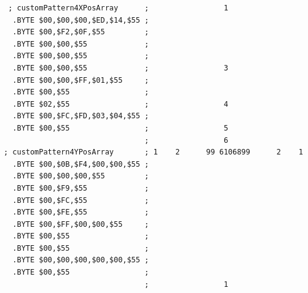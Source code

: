 \begin{lstlisting}
 ; customPattern4XPosArray      ;                 1                     
  .BYTE $00,$00,$00,$ED,$14,$55 ;                                       
  .BYTE $00,$F2,$0F,$55         ;                                       
  .BYTE $00,$00,$55             ;                                       
  .BYTE $00,$00,$55             ;                                       
  .BYTE $00,$00,$55             ;                 3                     
  .BYTE $00,$00,$FF,$01,$55     ;                                       
  .BYTE $00,$55                 ;                                       
  .BYTE $02,$55                 ;                 4                     
  .BYTE $00,$FC,$FD,$03,$04,$55 ;                                       
  .BYTE $00,$55                 ;                 5                     
                                ;                 6                     
; customPattern4YPosArray       ; 1    2      99 6106899      2    1    
  .BYTE $00,$0B,$F4,$00,$00,$55 ;                                       
  .BYTE $00,$00,$00,$55         ;                                       
  .BYTE $00,$F9,$55             ;                                       
  .BYTE $00,$FC,$55             ;                                       
  .BYTE $00,$FE,$55             ;                                       
  .BYTE $00,$FF,$00,$00,$55     ;                                       
  .BYTE $00,$55                 ;                                       
  .BYTE $00,$55                 ;                                       
  .BYTE $00,$00,$00,$00,$00,$55 ;                                       
  .BYTE $00,$55                 ;                                       
                                ;                 1                     
\end{lstlisting}


